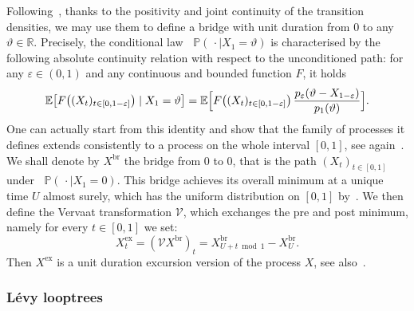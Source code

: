 \documentclass[british, a4paper,11pt]{article}
\numberwithin{equation}{section}
\theoremstyle{definition}
\renewcommand{\P}{\mathop{}\!\mathbb{P}}
\newcommand{\E}{\mathop{}\!\mathbb{E}}
\newcommand{\R}{\mathbb{R}}
\newcommand{\Ver}{\mathcal{V}}
\newcommand{\exc}{\mathrm{ex}}
\newcommand{\br}{\mathrm{br}}
\begin{document}
Following~\cite[Section~2]{Kni96}, thanks to the positivity and joint continuity of the transition densities, we may use them
to define a bridge with unit duration from $0$ to any $\vartheta \in \R$. Precisely, the conditional law $\P(\, \cdot \mid X_1=\vartheta)$ is characterised by the following absolute continuity relation with respect to the unconditioned path: for any $\varepsilon \in (0,1)$ and any continuous and bounded function $F$, it holds
\begin{equation}\label{eq:abs_cont}
\E\bigl[F\bigl((X_t)_{t \in [0,1-\varepsilon]}\bigr) \mid X_1=\vartheta\bigr] = \E\Bigl[F\bigl((X_t)_{t \in [0,1-\varepsilon]}\bigr)\, \frac{p_\varepsilon(\vartheta-X_{1-\varepsilon})}{p_1(\vartheta)}\Bigr].
\end{equation}
One can actually start from this identity and show that the family of processes it defines extends consistently to a process on the whole interval $[0,1]$, see again~\cite{Kni96}. 
We shall denote by $X^{\br}$ the bridge from $0$ to $0$, that is the path $(X_t)_{t \in [0,1]}$ under $\P(\, \cdot \mid X_1=0)$.
This bridge achieves its overall minimum at a unique time $U$ almost surely, which has the uniform distribution on $[0,1]$ by~\cite[Lemma~2.1 and Theorem~2.1]{Kni96}. We then define the Vervaat transformation $\Ver$, which exchanges the pre and post minimum, namely for every $t \in [0,1]$ we set:
\begin{equation}\label{eq:Vervaat}
X^{\exc}_t = (\Ver X^{\br})_t = X^{\br}_{U+t \bmod 1} - X^{\br}_U.
\end{equation}
Then $X^{\exc}$ is a unit duration excursion version of the process $X$, see also~\cite[Theorem~4]{UB14}. 



\subsubsection*{L\'evy looptrees}
\end{document}
